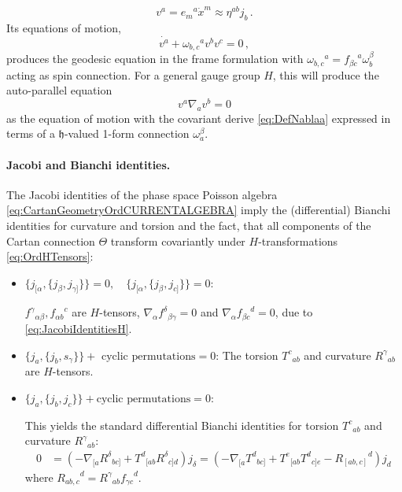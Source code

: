 \documentclass[11pt,a4paper]{article}
\numberwithin{equation}{section}
\newcommand{\commentO}[1]{ {\color{blue}  [{\bf O: #1}]}}
\begin{document}
\begin{equation}
  v^a = {e_m}^a \dot{x}^m \approx \eta^{ab} j_b\,.
\end{equation}
Its equations of motion,
\begin{equation}\label{eq:GeodesicEq}
  \dot{v^a} + {\omega_{b,c}}^a v^b v^c = 0\,,
\end{equation}
produces the geodesic equation in the frame formulation with ${\omega_{b,c}}^a = {f_{\beta c}}^a \omega_b^\beta$ acting as spin connection.%
For a general gauge group $H$, this will produce the auto-parallel equation
\begin{equation}
    v^a \nabla_a v^b = 0
\end{equation}
as the equation of motion with the covariant derive \eqref{eq:DefNablaa} expressed in terms of a $\mathfrak{h}$-valued 1-form connection $\omega_a^\beta$. %


\paragraph{Jacobi and Bianchi identities.} The Jacobi identities of the phase space Poisson algebra \eqref{eq:CartanGeometryOrdCURRENTALGEBRA} imply the (differential) Bianchi identities for curvature and torsion and the fact, that all components of the Cartan connection $\Theta$ transform covariantly under $H$-transformations  \eqref{eq:OrdHTensors}:
\begin{itemize}
	\item $\{ j_{[\alpha} , \{ j_\beta , j_{\gamma]} \} \} = 0, \quad \{ j_{[\alpha} , \{ j_\beta , j_{c]} \} \} = 0$:
	
	${f^\gamma}_{\alpha \beta},{f_{\alpha b}}^c$ are $H$-tensors, $\nabla_\alpha {f^\delta}_{\beta \gamma} = 0$ and $\nabla_\alpha {f_{\beta c}}^d = 0$, due to \eqref{eq:JacobiIdentitiesH}. 
	
	\item $\{ j_a , \{ j_b , s_\gamma \} \} + \text{ cyclic permutations} = 0$:
 The torsion ${T^c}_{ab}$ and curvature ${R^\gamma}_{ab}$ are $H$-tensors.
 
 \item $ \{ j_{a} , \{ j_b , j_{c} \} \} + \text{cyclic permutations} = 0$:
 
This yields the standard differential Bianchi identities for torsion ${T^c}_{ab}$ and curvature ${R^\gamma}_{ab}$:
 \begin{align}
     0 &= \left( - \nabla_{[a} {R^\delta}_{bc]} + {T^d}_{[ab} {R^\delta}_{c]d} \right) j_\delta \label{eq:OrdRicciIdentities} = \left( - \nabla_{[a} {T^d}_{bc]} + {T^e}_{[ab} {T^d}_{c]e} - {R_{[ab,c]}}^d \right) j_d 
 \end{align}
	where ${R_{ab,c}}^d = {R^\gamma}_{ab} {f_{\gamma c}}^d$.
\end{itemize}
\end{document}
